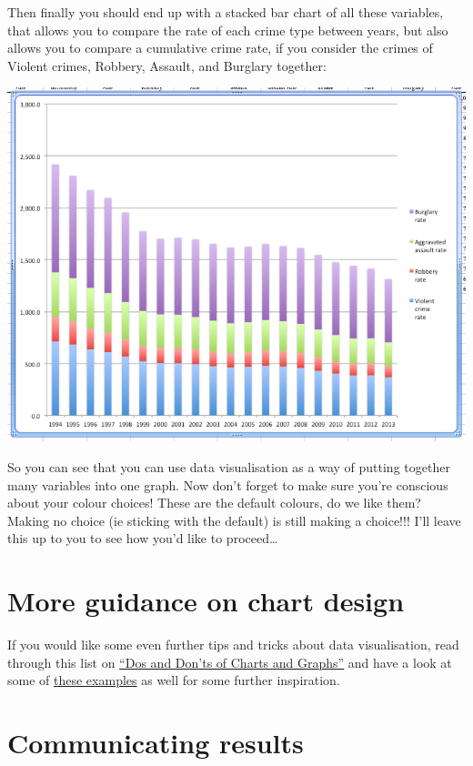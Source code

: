 \documentclass[
]{book}
\begin{document}
Then finally you should end up with a stacked bar chart of all these variables, that allows you to compare the rate of each crime type between years, but also allows you to compare a cumulative crime rate, if you consider the crimes of Violent crimes, Robbery, Assault, and Burglary together:

\includegraphics{imgs/stackedbar_final.png}

So you can see that you can use data visualisation as a way of putting together many variables into one graph. Now don't forget to make sure you're conscious about your colour choices! These are the default colours, do we like them? Making no choice (ie sticking with the default) is still making a choice!!! I'll leave this up to you to see how you'd like to proceed\ldots{}

\hypertarget{more-guidance-on-chart-design}{%
\section{More guidance on chart design}\label{more-guidance-on-chart-design}}

If you would like some even further tips and tricks about data visualisation, read through this list on \href{https://guides.library.duke.edu/datavis/topten}{``Dos and Don'ts of Charts and Graphs''} and have a look at some of \href{http://datajournalismhandbook.org/1.0/en/introduction_3.html}{these examples} as well for some further inspiration.

\hypertarget{communicating-results}{%
\section{Communicating results}\label{communicating-results}}
\end{document}
